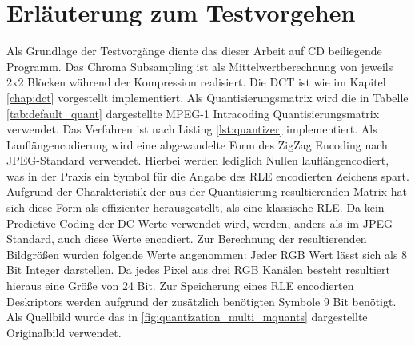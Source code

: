 \chapter{Erläuterung zum Testvorgehen}

Als Grundlage der Testvorgänge diente das dieser Arbeit auf CD beiliegende Programm. Das Chroma Subsampling ist als Mittelwertberechnung von jeweils 2x2 Blöcken während der Kompression realisiert. Die DCT ist wie im Kapitel \ref{chap:dct} vorgestellt implementiert. Als Quantisierungsmatrix wird die in Tabelle \ref{tab:default_quant} dargestellte MPEG-1 Intracoding Quantisierungsmatrix verwendet. Das Verfahren ist nach Listing \ref{lst:quantizer} implementiert. Als Lauflängencodierung wird eine abgewandelte Form des ZigZag Encoding nach JPEG-Standard verwendet. Hierbei werden lediglich Nullen lauflängencodiert, was in der Praxis ein Symbol für die Angabe des RLE encodierten Zeichens spart. Aufgrund der Charakteristik der aus der Quantisierung resultierenden Matrix hat sich diese Form als effizienter herausgestellt, als eine klassische RLE. Da kein Predictive Coding der DC-Werte verwendet wird, werden, anders als im JPEG Standard, auch diese Werte encodiert. Zur Berechnung der resultierenden Bildgrößen wurden folgende Werte angenommen: Jeder RGB Wert lässt sich als 8 Bit Integer darstellen. Da jedes Pixel aus drei RGB Kanälen besteht resultiert hieraus eine Größe von 24 Bit. Zur Speicherung eines RLE encodierten Deskriptors werden aufgrund der zusätzlich benötigten Symbole 9 Bit benötigt. Als Quellbild wurde das in \ref{fig:quantization_multi_mquants} dargestellte Originalbild verwendet.
